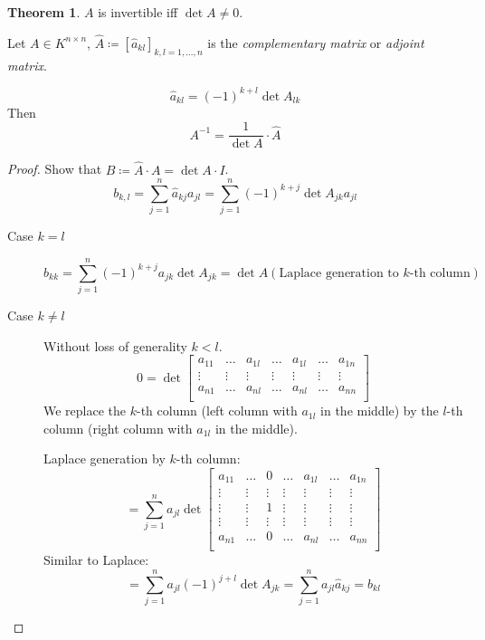 \documentclass[a4paper,landscape,twocolumn]{article}
\theoremstyle{definition}
\newtheorem{theorem}{Theorem}
\begin{document}
\begin{theorem}
  \label{satz-7.39}
  $A$ is invertible iff $\det{A} \neq 0$.

  Let $A \in K^{n \times n}$, $\hat{A} \coloneqq [\hat{a}_{kl}]_{k,l=1,\ldots,n}$
  is the \emph{complementary matrix} or \emph{adjoint matrix}.

  \[ \hat{a}_{kl} = (-1)^{k+l} \det{A_{lk}} \]
  Then
  \[ A^{-1} = \frac{1}{\det{A}} \cdot \hat{A} \]
\end{theorem}
\begin{proof}
  Show that $B \coloneqq \hat{A} \cdot A = \det{A} \cdot I$.
  \[ b_{k,l} = \sum_{j=1}^n \hat{a}_{kj} a_{jl} = \sum_{j=1}^n (-1)^{k+j} \det{A}_{jk} a_{jl} \]
  \begin{description}
    \item[Case $k=l$]
      \[ b_{kk} = \sum_{j=1}^n (-1)^{k+j} a_{jk} \det{A}_{jk} = \det{A} \left(\text{Laplace generation to $k$-th column}\right) \]
    \item[Case $k\neq l$]
      Without loss of generality $k < l$.
      \[
        0 = \det\begin{bmatrix}
          a_{11} & \ldots & a_{1l} & \ldots & a_{1l} & \ldots & a_{1n} \\
          \vdots & \vdots & \vdots & \vdots & \vdots & \vdots & \vdots \\
          a_{n1} & \ldots & a_{nl} & \ldots & a_{nl} & \ldots & a_{nn} \\
        \end{bmatrix}
      \]
      We replace the $k$-th column (left column with $a_{1l}$ in the middle)
      by the $l$-th column (right column with $a_{1l}$ in the middle).

      Laplace generation by $k$-th column:
      \[
        = \sum_{j=1}^n a_{jl} \det\begin{bmatrix}
          a_{11} & \ldots & 0 & \ldots & a_{1l} & \ldots & a_{1n} \\
          \vdots & \vdots & \vdots & \vdots & \vdots & \vdots & \vdots \\
          \vdots & \vdots & 1 & \vdots & \vdots & \vdots & \vdots \\
          \vdots & \vdots & \vdots & \vdots & \vdots & \vdots & \vdots \\
          a_{n1} & \ldots & 0 & \ldots & a_{nl} & \ldots & a_{nn} \\
        \end{bmatrix}
      \]
      Similar to Laplace:
      \[ = \sum_{j=1}^n a_{jl} (-1)^{j+l} \det{A_{jk}} = \sum_{j=1}^n a_{jl} \hat{a}_{kj} = b_{kl} \]
  \end{description}
\end{proof}
\end{document}
